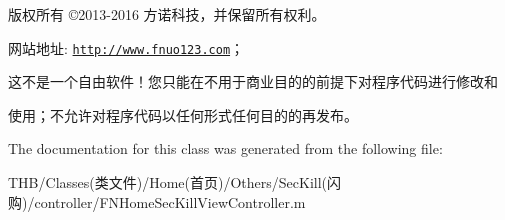 版权所有 ©2013-\/2016 方诺科技，并保留所有权利。

网站地址\+: \href{http://www.fnuo123.com}{\tt http\+://www.\+fnuo123.\+com}； 



这不是一个自由软件！您只能在不用于商业目的的前提下对程序代码进行修改和

使用；不允许对程序代码以任何形式任何目的的再发布。 

 

The documentation for this class was generated from the following file\+:\begin{DoxyCompactItemize}
\item 
T\+H\+B/\+Classes(类文件)/\+Home(首页)/\+Others/\+Sec\+Kill(闪购)/controller/F\+N\+Home\+Sec\+Kill\+View\+Controller.\+m\end{DoxyCompactItemize}
